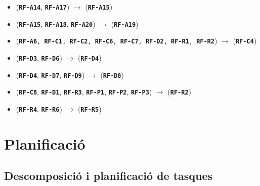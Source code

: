 \documentclass[a4paper,12pt]{ThesisStyle}
\begin{document}
\begin{itemize}
  \item (\texttt{\textbf{RF-A14}}, \texttt{\textbf{RF-A17}}) \hspace{1pt} $\longrightarrow$ \hspace{1pt} (\texttt{\textbf{RF-A15}})
  \item (\texttt{\textbf{RF-A15}}, \texttt{\textbf{RF-A18}}, \texttt{\textbf{RF-A20}}) \hspace{1pt} $\longrightarrow$ \hspace{1pt} (\texttt{\textbf{RF-A19}})
  \item (\texttt{\textbf{RF-A6}, \texttt{\textbf{RF-C1}}, \texttt{\textbf{RF-C2}}, \texttt{\textbf{RF-C6}}, \texttt{\textbf{RF-C7}}, \texttt{\textbf{RF-D2}}, \texttt{\textbf{RF-R1}}, \texttt{\textbf{RF-R2}}}) \hspace{1pt} $\longrightarrow$ \hspace{1pt} (\texttt{\textbf{RF-C4}})
  \item (\texttt{\textbf{RF-D3}}, \texttt{\textbf{RF-D6}}) \hspace{1pt} $\longrightarrow$ \hspace{1pt} (\texttt{\textbf{RF-D4}})
  \item (\texttt{\textbf{RF-D4}}, \texttt{\textbf{RF-D7}}, \texttt{\textbf{RF-D9}}) \hspace{1pt} $\longrightarrow$ \hspace{1pt} (\texttt{\textbf{RF-D8}})
  \item (\texttt{\textbf{RF-C8}}, \texttt{\textbf{RF-D1}}, \texttt{\textbf{RF-R3}}, \texttt{\textbf{RF-P1}}, \texttt{\textbf{RF-P2}}, \texttt{\textbf{RF-P3}}) \hspace{1pt} $\longrightarrow$ \hspace{1pt} (\texttt{\textbf{RF-R2}})
  \item (\texttt{\textbf{RF-R4}}, \texttt{\textbf{RF-R6}}) \hspace{1pt} $\longrightarrow$ \hspace{1pt} (\texttt{\textbf{RF-R5}})
\end{itemize}

\chapter{Planificació}  %
\label{cap:planificacio}

\section{Descomposició i planificació de tasques}
\label{sec:descomposicio_planificacio_tasques}
\end{document}
